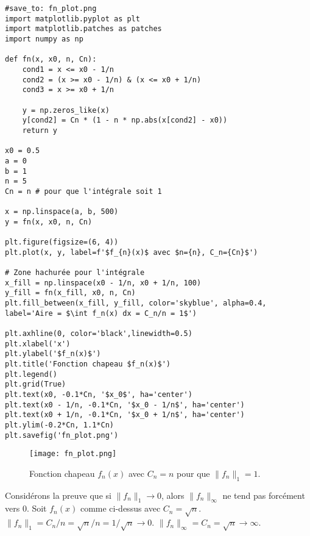 \documentclass{article}
\theoremstyle{definition} %
\begin{document}
\begin{verbatim}
#save_to: fn_plot.png
import matplotlib.pyplot as plt
import matplotlib.patches as patches
import numpy as np

def fn(x, x0, n, Cn):
    cond1 = x <= x0 - 1/n
    cond2 = (x >= x0 - 1/n) & (x <= x0 + 1/n)
    cond3 = x >= x0 + 1/n
    
    y = np.zeros_like(x)
    y[cond2] = Cn * (1 - n * np.abs(x[cond2] - x0))
    return y

x0 = 0.5
a = 0
b = 1
n = 5
Cn = n # pour que l'intégrale soit 1

x = np.linspace(a, b, 500)
y = fn(x, x0, n, Cn)

plt.figure(figsize=(6, 4))
plt.plot(x, y, label=f'$f_{n}(x)$ avec $n={n}, C_n={Cn}$')

# Zone hachurée pour l'intégrale
x_fill = np.linspace(x0 - 1/n, x0 + 1/n, 100)
y_fill = fn(x_fill, x0, n, Cn)
plt.fill_between(x_fill, y_fill, color='skyblue', alpha=0.4, label='Aire = $\int f_n(x) dx = C_n/n = 1$')

plt.axhline(0, color='black',linewidth=0.5)
plt.xlabel('x')
plt.ylabel('$f_n(x)$')
plt.title('Fonction chapeau $f_n(x)$')
plt.legend()
plt.grid(True)
plt.text(x0, -0.1*Cn, '$x_0$', ha='center')
plt.text(x0 - 1/n, -0.1*Cn, '$x_0 - 1/n$', ha='center')
plt.text(x0 + 1/n, -0.1*Cn, '$x_0 + 1/n$', ha='center')
plt.ylim(-0.2*Cn, 1.1*Cn)
plt.savefig('fn_plot.png')
\end{verbatim}

\begin{figure}[H]
\centering
\texttt{[image: fn\_plot.png]}
\caption{Fonction chapeau $f_n(x)$ avec $C_n=n$ pour que $\|f_n\|_1=1$.}
\label{fig:fn_plot}
\end{figure}

Considérons la preuve que si $\|f_n\|_1 \to 0$, alors $\|f_n\|_\infty$ ne tend pas forcément vers 0.
Soit $f_n(x)$ comme ci-dessus avec $C_n = \sqrt{n}$.
$\|f_n\|_1 = C_n/n = \sqrt{n}/n = 1/\sqrt{n} \to 0$.
$\|f_n\|_\infty = C_n = \sqrt{n} \to \infty$.
\end{document}
